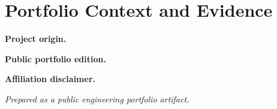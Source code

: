 \chapter*{Portfolio Context and Evidence}

\textbf{Project origin.} \projectorigin

\textbf{Public portfolio edition.} \publiceditionnote

\begin{analyticalevidencebox}
\analyticalevidence
\end{analyticalevidencebox}

\begin{simulatedevidencebox}
\simulatedevidence
\end{simulatedevidencebox}

\begin{measuredevidencebox}
\measuredevidence
\end{measuredevidencebox}

\begin{limitationbox}
\numericalscope
\end{limitationbox}

\textbf{Affiliation disclaimer.} \affiliationdisclaimer

\vfill
\begin{center}
\textit{Prepared as a public engineering portfolio artifact.}
\end{center}
